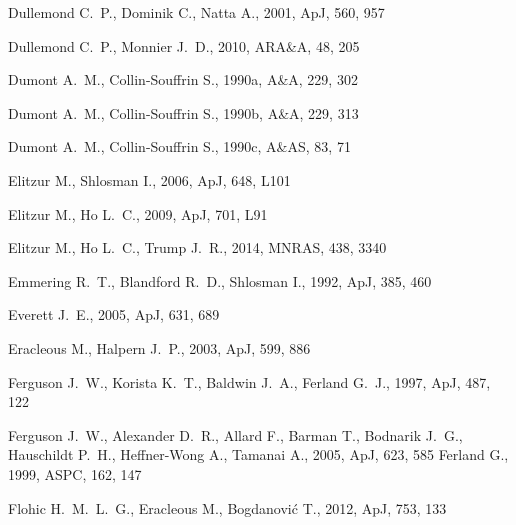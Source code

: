 \documentclass[a4paper,fleqn,usenatbib]{mnras}
\begin{document}
\begin{thebibliography}{99}
 Dullemond C.~P., Dominik C., Natta A., 2001, ApJ, 560, 957 

 Dullemond C.~P., Monnier J.~D., 2010, ARA\&A, 48, 205
 
 Dumont A.~M., Collin-Souffrin S., 1990a, A\&A, 229, 302 

 Dumont A.~M., Collin-Souffrin S., 1990b, A\&A, 229, 313 

 Dumont A.~M., Collin-Souffrin S., 1990c, A\&AS, 83, 71 

 Elitzur M., Shlosman I., 2006, ApJ, 648, L101 

 Elitzur M., Ho L.~C., 2009, ApJ, 701, L91
 
 Elitzur M., Ho L.~C., Trump J.~R., 2014, MNRAS, 438, 3340 

 Emmering R.~T., Blandford R.~D., Shlosman I., 1992, ApJ, 385, 460 

 Everett J.~E., 2005, ApJ, 631, 689
 
 Eracleous M., Halpern J.~P., 2003, ApJ, 599, 886
 
 Ferguson J.~W., Korista K.~T., Baldwin J.~A., Ferland G.~J., 1997, ApJ, 487, 122 

 Ferguson J.~W., Alexander D.~R., Allard F., Barman T., Bodnarik J.~G., Hauschildt P.~H., Heffner-Wong A., Tamanai A., 2005, ApJ, 623, 585 
 Ferland G., 1999, ASPC, 162, 147 

 Flohic H.~M.~L.~G., Eracleous M., Bogdanovi{\'c} T., 2012, ApJ, 753, 133 


\end{thebibliography}
\end{document}

